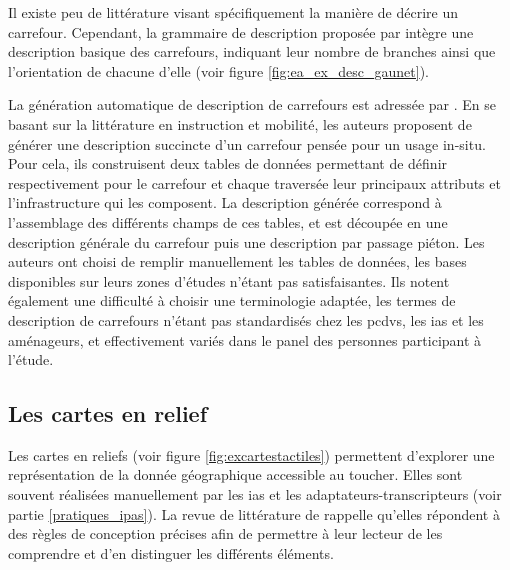 

\newpar{}

Il existe peu de littérature visant spécifiquement la manière de décrire un carrefour. Cependant, la grammaire de description proposée par \citet{gaunet_verbal_2006} intègre une description basique des carrefours, indiquant leur nombre de branches ainsi que l'orientation de chacune d'elle (voir figure \ref{fig:ea_ex_desc_gaunet}).

\newpar{}

La génération automatique de description de carrefours est adressée par \citet{Guth2019}. En se basant sur la littérature en instruction et mobilité, les auteurs proposent de générer une description succincte d'un carrefour pensée pour un usage in-situ. Pour cela, ils construisent deux tables de données permettant de définir respectivement pour le carrefour et chaque traversée leur principaux attributs et l'infrastructure qui les composent. La description générée correspond à l'assemblage des différents champs de ces tables, et est découpée en une description générale du carrefour puis une description par passage piéton. Les auteurs ont choisi de remplir manuellement les tables de données, les bases disponibles sur leurs zones d'études n'étant pas satisfaisantes. Ils notent également une difficulté à choisir une terminologie adaptée, les termes de description de carrefours n'étant pas standardisés chez les \glspl{pcdv}, les \glspl{ia} et les aménageurs, et effectivement variés dans le panel des personnes participant à l'étude.

\subsection{Les cartes en relief}

Les cartes en reliefs (voir figure \ref{fig:excartestactiles}) permettent d'explorer une représentation de la donnée géographique accessible au toucher. Elles sont souvent réalisées manuellement par les \glspl{ia} et les adaptateurs-transcripteurs (voir partie \ref{pratiques_ipas}). La revue de littérature de \citet{Wabinski2022} rappelle qu'elles répondent à des règles de conception précises afin de permettre à leur lecteur de les comprendre et d'en distinguer les différents éléments.

